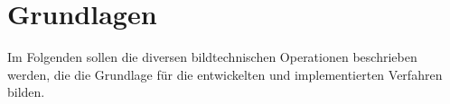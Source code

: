 \chapter{Grundlagen}
\writtenby{\dcauthornameewie}%
Im Folgenden sollen die diversen bildtechnischen Operationen beschrieben werden, die die Grundlage für die entwickelten und implementierten Verfahren bilden.









